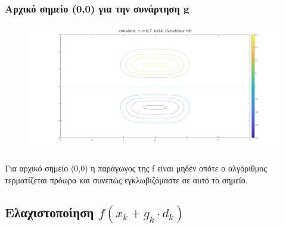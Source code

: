 \documentclass{article}
\begin{document}
\subsubsection*{Αρχικό σημείο (0,0) για την συνάρτηση g}
\begin{figure}[h!]	
     \centering  
     \advance\leftskip-0.2cm  
  \includegraphics[width=140mm,scale=2]{t1a.jpg}
\end{figure} 
Για αρχικό σημείο (0,0) η παράγωγος της f είναι μηδέν οπότε ο αλγόριθμος τερματίζεται πρόωρα και συνεπώς εγκλωβιζόμαστε σε αυτό το σημείο.
\newpage 
\subsection*{Ελαχιστοποίηση $f(x_k+g_k \cdot d_k )$ }

 
\end{document}

